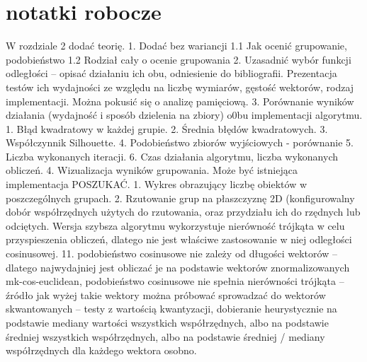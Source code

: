 \documentclass{article}
\begin{document}
\section{notatki robocze}
W rozdziale 2 dodać teorię.
	1. Dodać bez wariancji
	1.1 Jak ocenić grupowanie, podobieństwo
	1.2 Rodział cały o ocenie grupowania
	2. Uzasadnić wybór funkcji odległości – opisać działaniu ich obu, odniesienie do bibliografii. Prezentacja testów ich wydajności ze względu na liczbę wymiarów, gęstość wektorów, rodzaj implementacji. Można pokusić się o analizę pamięciową.
	3. Porównanie wyników działania (wydajność i sposób dzielenia na zbiory) o0bu implementacji algorytmu.
	1. Błąd kwadratowy w każdej grupie. 
	2. Średnia błędów kwadratowych.
	3. Współczynnik Silhouette.
	4. Podobieństwo zbiorów wyjściowych - porównanie
	5. Liczba wykonanych iteracji.
	6. Czas działania algorytmu, liczba wykonanych obliczeń.
	4. Wizualizacja wyników grupowania. Może być istniejąca implementacja POSZUKAĆ.
	1. Wykres obrazujący liczbę obiektów w poszczególnych grupach.
	2. Rzutowanie grup na płaszczyznę 2D (konfigurowalny dobór współrzędnych użytych do rzutowania, oraz przydziału ich do rzędnych lub odciętych.
	Wersja szybsza algorytmu wykorzystuje nierówność trójkąta w celu przyspieszenia obliczeń, dlatego nie jest właściwe zastosowanie w niej odległości cosinusowej.
	11. podobieństwo cosinusowe nie zależy od długości wektorów – dlatego najwydajniej jest obliczać je na podstawie wektorów znormalizowanych mk-cos-euclidean,
		podobieństwo cosinusowe nie spełnia nierówności trójkąta – źródło jak wyżej
		takie wektory można próbować sprowadzać do wektorów skwantowanych – testy z wartością kwantyzacji, dobieranie heurystycznie na podstawie mediany wartości wszystkich współrzędnych, albo na podstawie średniej wszystkich współrzędnych, albo na podstawie średniej / mediany współrzędnych dla każdego wektora osobno.
	


\end{document}
